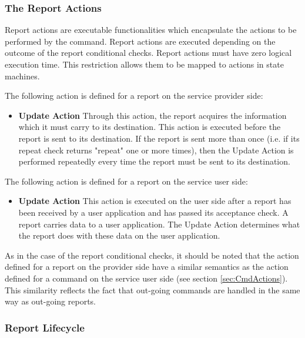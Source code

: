 \subsubsection{The Report Actions}\label{sec:RepActions}

Report actions are executable functionalities which encapsulate the actions to be performed by the command. Report actions are executed depending on the outcome of the report conditional checks. Report actions must have zero logical execution time. This restriction allows them to be mapped to actions in state machines. 

The following action is defined for a report on the service provider side:

\begin{itemize}
\item \textbf{Update Action}
Through this action, the report acquires the information which it must carry to its destination. This action is executed before the report is sent to its destination. If the report is sent more than once (i.e. if its repeat check returns "repeat" one or more times), then the Update Action is performed repeatedly every time the report must be sent to its destination.
\end{itemize} 

The following action is defined for a report on the service user side:

\begin{itemize}
\item \textbf{Update Action}
This action is executed on the user side after a report has been received by a user application and has passed its acceptance check. A report carries data to a user application. The Update Action determines what the report does with these data on the user application. 
\end{itemize} 

As in the case of the report conditional checks, it should be noted that the action defined for a report on the provider side have a similar semantics as the action defined for a command on the service user side (see section \ref{sec:CmdActions}). This similarity reflects the fact that out-going commands are handled in the same way as out-going reports.

\subsubsection{Report Lifecycle}\label{sec:RepLifecycle}

